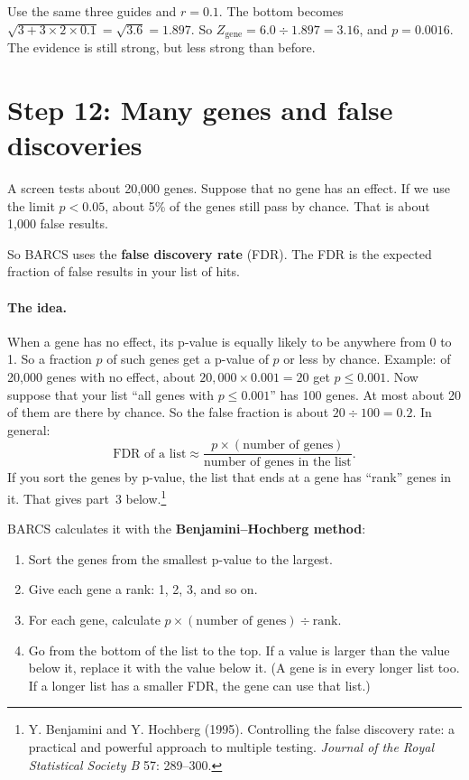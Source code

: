 \begin{worked}
Use the same three guides and $r = 0.1$.
The bottom becomes $\sqrt{3 + 3 \times 2 \times 0.1} = \sqrt{3.6} = 1.897$.
So $Z_{\text{gene}} = 6.0 \div 1.897 = 3.16$, and $p = 0.0016$.
The evidence is still strong, but less strong than before.
\end{worked}

\section{Step 12: Many genes and false discoveries}

A screen tests about 20{,}000 genes. Suppose that no gene has an effect. If
we use the limit $p < 0.05$, about 5\% of the genes still pass by chance.
That is about 1{,}000 false results.

So BARCS uses the \textbf{false discovery rate} (FDR). The FDR is the
expected fraction of false results in your list of hits.

\paragraph{The idea.} When a gene has no effect, its p-value is equally
likely to be anywhere from 0 to 1. So a fraction $p$ of such genes get a
p-value of $p$ or less by chance. Example: of 20{,}000 genes with no effect,
about $20{,}000 \times 0.001 = 20$ get $p \le 0.001$. Now suppose that your
list ``all genes with $p \le 0.001$'' has 100 genes. At most about 20 of them
are there by chance. So the false fraction is about $20 \div 100 = 0.2$. In
general:
\[
\text{FDR of a list} \approx \frac{p \times (\text{number of genes})}{\text{number of genes in the list}} .
\]
If you sort the genes by p-value, the list that ends at a gene has
``rank'' genes in it. That gives part~3 below.\footnote{Y. Benjamini and Y.
Hochberg (1995). Controlling the false discovery rate: a practical and
powerful approach to multiple testing. \emph{Journal of the Royal
Statistical Society B} 57: 289--300.}

BARCS calculates it with the \textbf{Benjamini--Hochberg method}:

\begin{enumerate}
\item Sort the genes from the smallest p-value to the largest.
\item Give each gene a rank: 1, 2, 3, and so on.
\item For each gene, calculate $p \times (\text{number of genes}) \div
  \text{rank}$.
\item Go from the bottom of the list to the top. If a value is larger than
  the value below it, replace it with the value below it. (A gene is in
  every longer list too. If a longer list has a smaller FDR, the gene can
  use that list.)
\end{enumerate}

